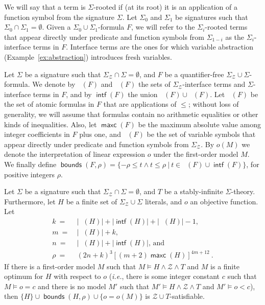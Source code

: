 \documentclass{llncs}
\newcommand{\ie}[0]{\emph{i.e.}, }
\newcommand{\Z}[0]{\ensuremath{\mathcal{Z}}}
\newcommand{\ZT}[0]{\ensuremath{\mathcal{Z} \cup T}}
\newcommand{\SigmaZ}[0]{\ensuremath{\Sigma_{\mathcal{Z}}}}
\newcommand{\SigmaZT}[0]{\ensuremath{\SigmaZ{} \cup \Sigma}}
\DeclareMathOperator{\intf}{\mathsf{intf}}
\DeclareMathOperator{\intfz}{\mathsf{intf}_{\Z}}
\DeclareMathOperator{\intfsigma}{\mathsf{intf}_{\Sigma}}
\DeclareMathOperator{\maxc}{\mathsf{maxc}}
\DeclareMathOperator{\zatoms}{\mathsf{atoms_{\Z}}}
\DeclareMathOperator{\bounds}{\mathsf{bounds}}
\DeclareMathOperator{\zvars}{\mathsf{vars_{\Z}}}
\begin{document}
We will say that a term is $\Sigma$-rooted if (at its root) it is an
application of a function symbol from the signature $\Sigma$. Let
$\Sigma_0$ and $\Sigma_1$ be signatures such that $\Sigma_0 \cap
\Sigma_1 = \emptyset$. Given a $\Sigma_0 \cup \Sigma_1$-formula $F$,
we will refer to the $\Sigma_i$-rooted terms that appear directly
under predicate and function symbols from $\Sigma_{1 - i}$ as the
$\Sigma_i$-interface terms in $F$. Interface terms are the ones for
which variable abstraction (Example~\ref{ex:abstraction}) introduces
fresh variables.

Let $\Sigma$ be a signature such that $\SigmaZ{} \cap \Sigma =
\emptyset$, and $F$ be a quantifier-free $\SigmaZT{}$-formula. We
denote by $\intfz(F)$ and $\intfsigma(F)$ the sets of
$\SigmaZ$-interface terms and $\Sigma$-interface terms in $F$, and by
$\intf(F)$ the union $\intfsigma(F) \cup \intfz(F)$. Let $\zatoms(F)$
be the set of atomic formulas in $F$ that are applications of $\leq$;
without loss of generality, we will assume that formulas contain no
arithmetic equalities or other kinds of inequalities. Also, let
$\maxc(F)$ be the maximum absolute value among integer coefficients in
$F$ plus one, and $\zvars(F)$ be the set of variable symbols that
appear directly under predicate and function symbols from
\SigmaZ{}. By $o(M)$ we denote the interpretation of linear expression
$o$ under the first-order model $M$. We finally define $\bounds(F,
\rho) = \{-\rho \leq t \wedge t \leq \rho\ |\ t \in \zvars(F) \cup
\intf(F) \}$, for positive integers $\rho$.

\begin{lemma}
  \label{lemma:ztbounds}
  Let $\Sigma$ be a signature such that $\SigmaZ{} \cap \Sigma =
  \emptyset$, and $T$ be a stably-infinite $\Sigma$-theory.
  Furthermore, let $H$ be a finite set of \SigmaZT{} literals, and $o$
  an objective function. Let
  \begin{align*}
    k~=&~|\zatoms(H)| + |\intf(H)| + |\zvars(H)| - 1, \\
    m~=&~|\intfz(H)| + k, \\
    n~=&~|\zvars(H)| + |\intf(H)| \text{, and} \\
    \rho~=&~(2 n + k)^3 [(m + 2) \maxc(H)]^{4m + 12}~.
  \end{align*}
  If there is a first-order model $M$ such that $M \models H \wedge
  \Z{} \wedge T$ and $M$ is a finite optimum for $H$ with respect to
  $o$ (\ie there is some integer constant $c$ such that $M \models o =
  c$ and there is no model $M'$ such that $M' \models H \wedge \Z{}
  \wedge T$ and $M' \models o < c$), then $\{H\} \cup \bounds(H, \rho)
  \cup \{o = o(M)\}$ is \ZT{}-satisfiable.
\end{lemma}
\end{document}
